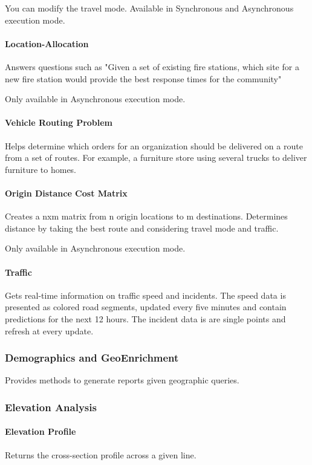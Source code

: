 \documentclass{vgtc}                          %
\begin{document}
You can modify the travel mode. Available in Synchronous and Asynchronous execution mode.

\paragraph{Location-Allocation}
Answers questions such as "Given a set of existing fire stations, which site for a new fire station would provide the best response times for the community"

Only available in Asynchronous execution mode.

\paragraph{Vehicle Routing Problem}
Helps determine which orders for an organization should be delivered on a route from a set of routes. For example, a furniture store using several trucks to deliver furniture to homes.

\paragraph{Origin Distance Cost Matrix}
Creates a nxm matrix from n origin locations to m destinations. Determines distance by taking the best route and considering travel mode and traffic. 

Only available in Asynchronous execution mode.

\paragraph{Traffic}
Gets real-time information on traffic speed and incidents. The speed data is presented as colored road segments, updated every five minutes and contain predictions for the next 12 hours. The incident data is are single points and refresh at every update. 


\subsubsection{Demographics and GeoEnrichment}

Provides methods to generate reports given geographic queries.


\subsubsection{Elevation Analysis}

\paragraph{Elevation Profile}
Returns the cross-section profile across a given line.
\end{document}
